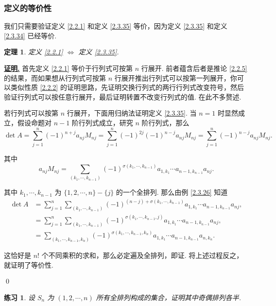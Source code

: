 \documentclass[10pt,openany]{article}
\theoremstyle{thmstyle} %
\newtheorem{theorem}{定理}[subsection]
\newtheorem{practice}{练习}[section]
\theoremstyle{defstyle} %
\theoremstyle{prostyle} %
\theoremstyle{exastyle}
\theoremstyle{remstyle}
\renewenvironment{proof}[1][证明]{\par\underline{\textbf{#1.}} \;\fangsong}{\qed\par}
\begin{document}
\subsubsection{定义的等价性}

我们只需要验证定义 \ref{2.2.1} 和定义 \ref{2.3.35} 等价，因为定义 \ref{2.3.35} 和定义 \ref{2.3.34} 已经等价.

\begin{theorem}
	定义 \ref{2.2.1} \( \Leftrightarrow \) 定义 \ref{2.3.35}.
\end{theorem}

\begin{proof}
	首先定义 \ref{2.2.1} 等价于行列式可按第 \( n \) 行展开. 前者蕴含后者是推论 \ref{2.2.5} 的结果，而如果想从行列式可按第 \( n \) 行展开推出行列式可以按第一列展开，你可以类似性质 \ref{2.2.2} 的证明思路，先证明交换行列式的两行行列式改变符号，然后验证行列式可以按任意行展开，最后证明转置不改变行列式的值. 在此不多赘述.
	
	若行列式可以按第 \( n \) 行展开，下面用归纳法证明定义 \ref{2.3.35}. 当 \( n=1 \) 时显然成立，假设命题对 \( n-1 \) 阶行列式成立，研究 \( n \) 阶行列式，那么
	\[ \det A= \sum_{j=1}^{n} (-1)^{n+j} a_{nj} M_{nj}= \sum_{j=1}^{n} (-1)^{2j} (-1)^{n-j} a_{nj} M_{nj}= \sum_{j=1}^{n}  (-1)^{n-j} a_{nj} M_{nj}. \]
	
	其中 
	\[ a_{nj}M_{nj}= \sum_{(k_1,\cdots,k_{n-1}) }^{} (-1)^{\sigma(k_1,\cdots,k_{n-1})} a_{1,k_1}\cdots a_{n-1,k_{n-1}} a_{nj}. \]
	
	其中 \( k_1,\cdots,k_{n-1} \) 为 \( \{1,2,\cdots,n\}-\{j\} \) 的一个全排列. 那么由例 \ref{2.3.26} 知道
	\begin{align*}
		\det A &= \sum_{j=1}^{n} \sum_{(k_1,\cdots,k_{n-1}) }^{}  (-1)^{(n-j)+\sigma(k_1,\cdots,k_{n-1})} a_{1,k_1}\cdots a_{n-1,k_{n-1}} a_{nj}, \\
		&= \sum_{j=1}^{n} \sum_{(k_1,\cdots,k_{n-1}) }^{}  (-1)^{\sigma(k_1,\cdots,k_{n-1},j)} a_{1,k_1}\cdots a_{n-1,k_{n-1}}a_{nj}, \\
		&= \sum_{(k_1,\cdots,k_{n-1},k_n) }^{}  (-1)^{\sigma(k_1,\cdots,k_{n-1},k_n)} a_{1,k_1}\cdots a_{n-1,k_{n-1}}a_{n,k_n}.
	\end{align*}
    
    这恰好是 \( n! \) 个不同乘积的求和，那么必定遍及全排列，即证. 将上述过程反之，就证明了等价性.
    
\end{proof}

\begin{practice}
	设 \( S_n \) 为 \( (1,2,\cdots,n) \) 所有全排列构成的集合，证明其中奇偶排列各半.
\end{practice}
\end{document}
